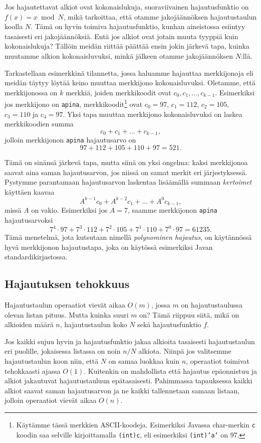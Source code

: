 Jos hajautettavat alkiot ovat kokonaislukuja,
suoraviivainen hajautusfunktio on $f(x)=x \bmod N$,
mikä tarkoittaa, että otamme jakojäännöksen hajautustaulun koolla $N$.
Tämä on hyvin toimiva hajautusfunktio,
kunhan aineistossa esiintyy tasaisesti eri jakojäännöksiä.
Entä jos alkiot ovat jotain muuta tyyppiä kuin kokonaislukuja?
Tällöin meidän riittää päättää ensin jokin järkevä tapa,
kuinka muutamme alkion kokonaisluvuksi,
minkä jälkeen otamme jakojäännöksen $N$:llä.

Tarkastellaan esimerkkinä tilannetta, jossa haluamme hajauttaa merkkijonoja
eli mei\-dän täytyy löytää keino muuttaa merkkijono kokonaisluvuksi.
Oletamme, että merkkijonossa on $k$ merkkiä,
joiden merkkikoodit ovat $c_0,c_1,\dots,c_{k-1}$.
Esimerkiksi jos merkkijono on \texttt{apina},
merkkikoodit\footnote{Käytämme tässä merkkien ASCII-koodeja.
Esimerkiksi Javassa char-merkin \texttt{c} koodin saa
selville kirjoittamalla \texttt{(int)c}, eli esimerkiksi
\texttt{(int)'a'} on 97.} ovat $c_0=97$, $c_1=112$, $c_2=105$,
$c_3=110$ ja $c_4=97$.
Yksi tapa muuttaa merkkijono kokonaisluvuksi
on laskea merkkikoodien summa
\[ c_0 + c_1 + \dots + c_{k-1},\]
jolloin merkkijonon \texttt{apina} hajautusarvo on
\[97+112+105+110+97=521.\]

Tämä on sinänsä järkevä tapa, mutta siinä on yksi ongelma:
kaksi merkkijonoa saavat aina saman hajautusarvon,
jos niissä on samat merkit eri järjestyksessä.
Pystymme parantamaan hajautusarvon laskentaa lisäämällä
summaan \emph{kertoimet} käyttäen kaavaa
\[ A^{k-1} c_0 + A^{k-2} c_1 + \dots + A^0 c_{k-1},\]
missä $A$ on vakio.
Esimerkiksi jos $A=7$, saamme merkkijonon \texttt{apina} hajautusarvoksi
\[7^4 \cdot 97+7^3 \cdot 112+7^2 \cdot 105+7^1 \cdot 110+7^0 \cdot 97=61235.\]
Tämä menetelmä, jota kutsutaan nimellä \emph{polynominen hajautus},
on käytän\-nössä hyvä merkkijonon hajautustapa,
joka on käytössä esimerkiksi Javan standardikirjastossa.

\subsection{Hajautuksen tehokkuus}

Hajautustaulun operaatiot vievät aikaa $O(m)$,
jossa $m$ on hajautustaulussa olevan listan pituus.
Mutta kuinka suuri $m$ on? Tämä riippuu siitä,
mikä on alkioiden määrä $n$, hajautustaulun koko $N$
sekä hajautusfunktio $f$.

Jos kaikki sujuu hyvin ja hajautusfunktio jakaa alkioita
tasaisesti hajautustaulun eri puolille,
jokaisessa listassa on noin $n/N$ alkiota.
Niinpä jos valitsemme hajautustaulun koon niin,
että $N$ on samaa luokkaa kuin $n$,
operaatiot toimivat tehokkaasti ajassa $O(1)$.
Kuitenkin on mahdollista että hajautus epäonnistuu
ja alkiot jakautuvat hajautustauluun epätasaisesti.
Pahimmassa tapauksessa kaikki alkiot saavat saman
hajautusarvon ja ne kaikki tallennetaan samaan listaan,
jolloin operaatiot vievät aikaa $O(n)$.


